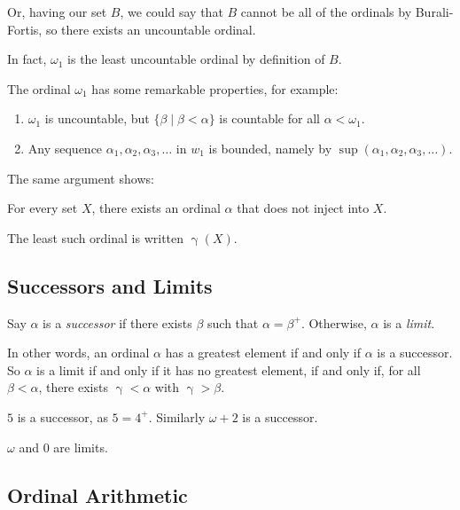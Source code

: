 \documentclass[12pt]{article}
\begin{document}
\begin{remark}
	Or, having our set $B$, we could say that $B$ cannot be all of the ordinals by Burali-Fortis, so there exists an uncountable ordinal.

	In fact, $\omega_1$ is the least uncountable ordinal by definition of $B$.
\end{remark}

The ordinal $\omega_1$ has some remarkable properties, for example:
\begin{enumerate}[1.]
	\item $\omega_1$ is uncountable, but $\{ \beta \mid \beta < \alpha\}$ is countable for all $\alpha < \omega_1$.
	\item Any sequence $\alpha_1, \alpha_2, \alpha_3, \dots$ in $w_1$ is bounded, namely by $\sup(\alpha_1, \alpha_2, \alpha_3, \dots)$.
\end{enumerate}

The same argument shows:
\begin{theorem}
	For every set $X$, there exists an ordinal $\alpha$ that does not inject into $X$.
\end{theorem}

The least such ordinal is written $\upgamma(X)$.

\subsection{Successors and Limits}
\label{sub:successors_and_limits}

Say $\alpha$ is a \emph{successor} if there exists $\beta$ such that $\alpha = \beta^{+}$. Otherwise, $\alpha$ is a \emph{limit}.

In other words, an ordinal $\alpha$ has a greatest element if and only if $\alpha$ is a successor. So $\alpha$ is a limit if and only if it has no greatest element, if and only if, for all $\beta < \alpha$, there exists $\upgamma < \alpha$ with $\upgamma > \beta$.

\begin{exbox}
	$5$ is a successor, as $5 = 4^{+}$. Similarly $\omega + 2$ is a successor.

	$\omega$ and $0$ are limits.
\end{exbox}

\subsection{Ordinal Arithmetic}
\label{sub:ordinal_arithmetic}
\end{document}

